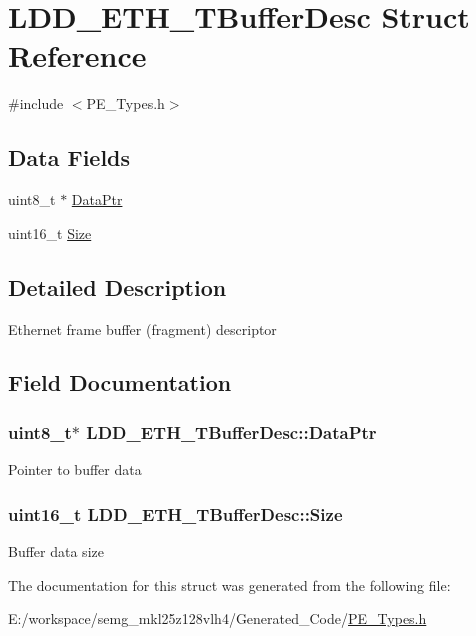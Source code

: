 \hypertarget{struct_l_d_d___e_t_h___t_buffer_desc}{\section{L\-D\-D\-\_\-\-E\-T\-H\-\_\-\-T\-Buffer\-Desc Struct Reference}
\label{struct_l_d_d___e_t_h___t_buffer_desc}
}


{\ttfamily \#include $<$P\-E\-\_\-\-Types.\-h$>$}

\subsection*{Data Fields}
\begin{DoxyCompactItemize}
\item 
uint8\-\_\-t $\ast$ \hyperlink{struct_l_d_d___e_t_h___t_buffer_desc_af9049f0d40faa480a4de3532a1de4605}{Data\-Ptr}
\item 
uint16\-\_\-t \hyperlink{struct_l_d_d___e_t_h___t_buffer_desc_abddc4273b732d3cf44ff0b6870d6b87a}{Size}
\end{DoxyCompactItemize}


\subsection{Detailed Description}
Ethernet frame buffer (fragment) descriptor 

\subsection{Field Documentation}
\hypertarget{struct_l_d_d___e_t_h___t_buffer_desc_af9049f0d40faa480a4de3532a1de4605}{
\subsubsection[{Data\-Ptr}]{\setlength{\rightskip}{0pt plus 5cm}uint8\-\_\-t$\ast$ L\-D\-D\-\_\-\-E\-T\-H\-\_\-\-T\-Buffer\-Desc\-::\-Data\-Ptr}}\label{struct_l_d_d___e_t_h___t_buffer_desc_af9049f0d40faa480a4de3532a1de4605}
Pointer to buffer data \hypertarget{struct_l_d_d___e_t_h___t_buffer_desc_abddc4273b732d3cf44ff0b6870d6b87a}{
\subsubsection[{Size}]{\setlength{\rightskip}{0pt plus 5cm}uint16\-\_\-t L\-D\-D\-\_\-\-E\-T\-H\-\_\-\-T\-Buffer\-Desc\-::\-Size}}\label{struct_l_d_d___e_t_h___t_buffer_desc_abddc4273b732d3cf44ff0b6870d6b87a}
Buffer data size 

The documentation for this struct was generated from the following file\-:\begin{DoxyCompactItemize}
\item 
E\-:/workspace/semg\-\_\-mkl25z128vlh4/\-Generated\-\_\-\-Code/\hyperlink{_p_e___types_8h}{P\-E\-\_\-\-Types.\-h}\end{DoxyCompactItemize}
